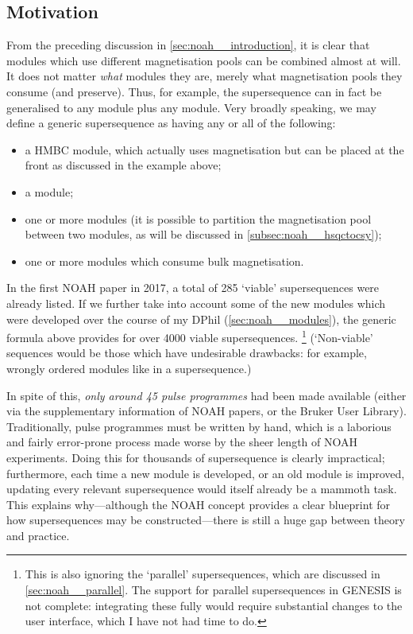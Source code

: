 \subsection{Motivation}
\label{subsec:noah__genesis_motivation}

From the preceding discussion in \cref{sec:noah__introduction}, it is clear that modules which use different magnetisation pools can be combined almost at will.
It does not matter \textit{what} modules they are, merely what magnetisation pools they consume (and preserve).
Thus, for example, the  supersequence can in fact be generalised to any  module plus any  module.
Very broadly speaking, we may define a generic supersequence as having any or all of the following:

\begin{itemize}
    \item a HMBC module, which actually uses  magnetisation but can be placed at the front as discussed in the  example above;
    \item a  module;
    \item one or more  modules (it is possible to partition the  magnetisation pool between two modules, as will be discussed in \cref{subsec:noah__hsqctocsy});
    \item one or more  modules which consume bulk magnetisation.
\end{itemize}

In the first NOAH paper in 2017\autocite{Kupce2017ACIE}, a total of 285 `viable' supersequences were already listed.
If we further take into account some of the new modules which were developed over the course of my DPhil (\cref{sec:noah__modules}), the generic formula above provides for over 4000 viable supersequences.%
\footnote{This is also ignoring the `parallel' supersequences, which are discussed in \cref{sec:noah__parallel}. The support for parallel supersequences in GENESIS is not complete: integrating these fully would require substantial changes to the user interface, which I have not had time to do.}
(`Non-viable' sequences would be those which have undesirable drawbacks: for example, wrongly ordered modules like in a  supersequence.)

In spite of this, \textit{only around 45 pulse programmes} had been made available (either via the supplementary information of NOAH papers, or the Bruker User Library).
Traditionally, pulse programmes must be written by hand, which is a laborious and fairly error-prone process made worse by the sheer length of NOAH experiments.
Doing this for thousands of supersequence is clearly impractical; furthermore, each time a new module is developed, or an old module is improved, updating every relevant supersequence would itself already be a mammoth task.
This explains why---although the NOAH concept provides a clear blueprint for how supersequences may be constructed---there is still a huge gap between theory and practice.


